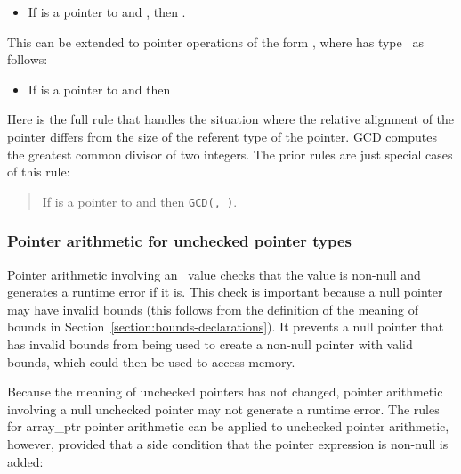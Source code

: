 \begin{itemize}
\item
  If  is a pointer to  and 
  ,
  then .
\end{itemize}

This can be extended to pointer operations of the form ,
where  has type
\arrayptrT\ as
follows:

\begin{itemize}
\item
  If  is a pointer to  and 
  then 
\end{itemize}

Here is the full rule that handles the situation where the relative
alignment of the pointer differs from the size of the referent type of
the pointer. GCD computes the greatest common divisor of two integers.
The prior rules are just special cases of this rule:

\begin{quote}
If  is a pointer to  and 
            {
                       {}
                       {}}
then 
                 {
                            {}
                            {\texttt{GCD(, )}}}.
\end{quote}

\subsubsection{Pointer arithmetic for unchecked pointer types}

Pointer arithmetic involving an \arrayptr\ value checks that
the value is non-null and generates a runtime error if it is. This check
is important because a null pointer may have invalid bounds (this
follows from the definition of the meaning of bounds in 
Section~\ref{section:bounds-declarations}). It
prevents a null pointer that has invalid bounds from being used to create a
non-null pointer with valid bounds, which could then be used to access
memory.

Because the meaning of unchecked pointers has not changed, pointer
arithmetic involving a null unchecked pointer may not generate a runtime
error. The rules for array\_ptr pointer arithmetic can be applied to
unchecked pointer arithmetic, however, provided that a side condition that
the pointer expression is non-null is added:

